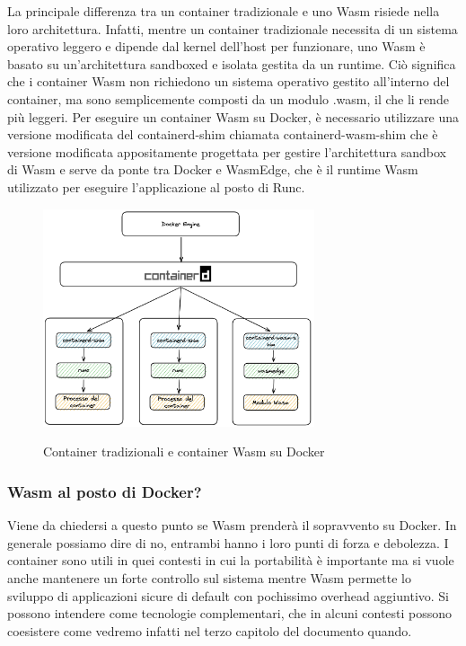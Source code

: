 La principale differenza tra un container tradizionale e uno Wasm risiede nella loro architettura. Infatti, mentre un
container tradizionale necessita di un sistema operativo leggero e dipende dal kernel dell'host per funzionare, uno Wasm
è basato su un'architettura sandboxed e isolata gestita da un runtime. Ciò significa che i container Wasm non richiedono
un sistema operativo gestito all'interno del container, ma sono semplicemente composti da un modulo .wasm, il che li
rende più leggeri. Per eseguire un container Wasm su Docker, è necessario utilizzare una versione modificata del
containerd-shim chiamata containerd-wasm-shim che è versione modificata appositamente progettata per gestire
l'architettura sandbox di Wasm e serve da ponte tra Docker e WasmEdge, che è il runtime Wasm utilizzato per eseguire
l'applicazione al posto di Runc.
\begin{figure}[h]
    \centering
    \captionsetup{justification=centering}
    \includegraphics[width=8cm]{./chapters/2.wasi-in-depth/images/10.docker_and_wasm.png}
    \label{docker_and_wasm_wasmedge}
    \caption{Container tradizionali e container Wasm su Docker}
\end{figure}

\subsubsection{Wasm al posto di Docker?}
Viene da chiedersi a questo punto se Wasm prenderà il sopravvento su Docker\cite{why-containers-and-wasm}. In generale possiamo dire di no, entrambi
hanno i loro punti di forza e debolezza. I container sono utili in quei contesti in cui la portabilità è importante ma
si vuole anche mantenere un forte controllo sul sistema mentre Wasm permette lo sviluppo di applicazioni sicure di
default con pochissimo overhead aggiuntivo. Si possono intendere come tecnologie complementari, che in alcuni contesti
possono coesistere come vedremo infatti nel terzo capitolo del documento quando.


